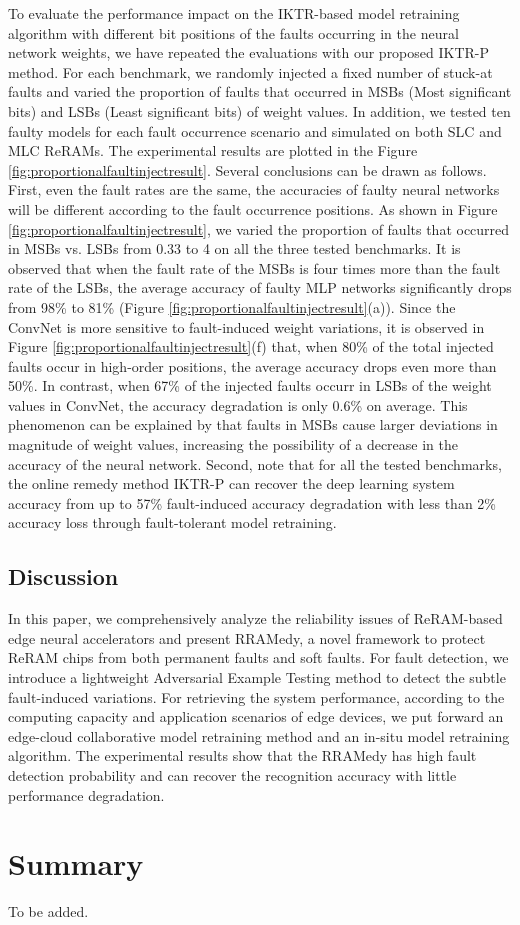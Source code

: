 To evaluate the performance impact on the IKTR-based model retraining algorithm with different bit positions of the faults occurring in the neural network weights,  we have repeated the evaluations with our proposed IKTR-P method. For each benchmark, we randomly injected a fixed number of stuck-at faults and varied the proportion of faults that occurred in MSBs (Most significant bits) and LSBs (Least significant bits) of weight values. In addition, we tested ten faulty models for each fault occurrence scenario and simulated on both SLC and MLC ReRAMs. The experimental results are plotted in the Figure \ref{fig:proportionalfaultinjectresult}. Several conclusions can be drawn as follows. First, even the fault rates are the same, the accuracies of faulty neural networks will be different according to the fault occurrence positions. As shown in Figure \ref{fig:proportionalfaultinjectresult}, we varied the proportion of faults that occurred in MSBs vs. LSBs from 0.33 to 4 on all the three tested benchmarks. It is observed that when the fault rate of the MSBs is four times more than the fault rate of the LSBs, the average accuracy of faulty MLP networks significantly drops from {98\%} to {81\%} (Figure \ref{fig:proportionalfaultinjectresult}(a)). Since the ConvNet is more sensitive to fault-induced weight variations, it is observed in Figure \ref{fig:proportionalfaultinjectresult}(f) that, when {80\%} of the total injected faults occur in high-order positions, the average accuracy drops even more than 50\%. In contrast, when {67\%} of the injected faults occurr in LSBs of the weight values in ConvNet, the accuracy degradation is only {0.6\%} on average. This phenomenon can be explained by that faults in MSBs cause larger deviations in magnitude of weight values, increasing the possibility of a decrease in the accuracy of the neural network. Second, note that for all the tested benchmarks, the online remedy method IKTR-P can recover the deep learning system accuracy from up to {57\%} fault-induced accuracy degradation with less than {2\%} accuracy loss through fault-tolerant model retraining.

\subsection{Discussion}
In this paper, we comprehensively analyze the reliability issues of ReRAM-based edge neural accelerators and present RRAMedy, a novel framework to protect ReRAM chips from both permanent faults and soft faults. For fault detection, we introduce a lightweight Adversarial Example Testing method to detect the subtle fault-induced variations. For retrieving the system performance, according to the computing capacity and application scenarios of edge devices, we put forward an edge-cloud collaborative model retraining method and an in-situ model retraining algorithm. The experimental results show that the RRAMedy has high fault detection probability and can recover the recognition accuracy with little performance degradation.

\section{Summary}
To be added.






